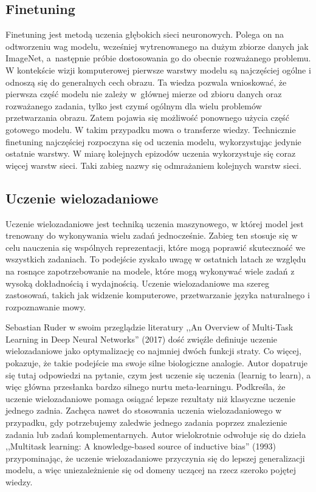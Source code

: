 \subsection{Finetuning}
Finetuning jest metodą uczenia głębokich sieci neuronowych. Polega on na odtworzeniu wag modelu, wcześniej wytrenowanego na dużym zbiorze danych jak ImageNet, a~następnie próbie dostosowania go do obecnie rozważanego problemu. W kontekście wizji komputerowej pierwsze warstwy modelu są najczęściej ogólne i odnoszą się do generalnych cech obrazu. Ta wiedza pozwala wnioskować, że pierwsza część modelu nie zależy w~głównej mierze od zbioru danych oraz rozważanego zadania, tylko jest czymś ogólnym dla wielu problemów przetwarzania obrazu. Zatem pojawia się możliwość ponownego użycia część gotowego modelu. W takim przypadku mowa o transferze wiedzy. Technicznie finetuning najczęściej rozpoczyna się od uczenia modelu, wykorzystując jedynie ostatnie warstwy. W miarę kolejnych epizodów uczenia wykorzystuje się coraz więcej warstw sieci. Taki zabieg nazwy się odmrażaniem kolejnych warstw sieci.
\subsection{Uczenie wielozadaniowe}
Uczenie wielozadaniowe jest techniką uczenia maszynowego, w której model jest trenowany do wykonywania wielu zadań jednocześnie. Zabieg ten stosuje się w celu nauczenia się wspólnych reprezentacji, które mogą poprawić skuteczność we wszystkich zadaniach. To podejście zyskało uwagę w ostatnich latach ze względu na rosnące zapotrzebowanie na modele, które mogą wykonywać wiele zadań z wysoką dokładnością i wydajnością. Uczenie wielozadaniowe ma szereg zastosowań, takich jak widzenie komputerowe, przetwarzanie języka naturalnego i rozpoznawanie mowy.

Sebastian Ruder w swoim przeglądzie literatury ,,An Overview of Multi-Task Learning in Deep Neural Networks'' (2017) \cite{ruder2017overview} dość zwięźle definiuje uczenie wielozadaniowe jako optymalizację co najmniej dwóch funkcji straty. Co więcej, pokazuje, że takie podejście ma swoje silne biologiczne analogie. Autor dopatruje się tutaj odpowiedzi na pytanie, czym jest uczenie się uczenia (learnig to learn), a więc główna przesłanka bardzo silnego nurtu meta-learningu. Podkreśla, że uczenie wielozadaniowe pomaga osiągać lepsze rezultaty niż klasyczne uczenie jednego zadnia. Zachęca nawet do stosowania uczenia wielozadaniowego w przypadku, gdy potrzebujemy zaledwie jednego zadania poprzez znalezienie zadania lub zadań komplementarnych. Autor wielokrotnie odwołuje się do dzieła ,,Multitask learning: A knowledge-based source of inductive bias'' (1993) \cite{caruana1993multitask} przypominając, że uczenie wielozadaniowe przyczynia się do lepszej generalizacji modelu, a więc uniezależnienie się od domeny uczącej na rzecz szeroko pojętej wiedzy.

